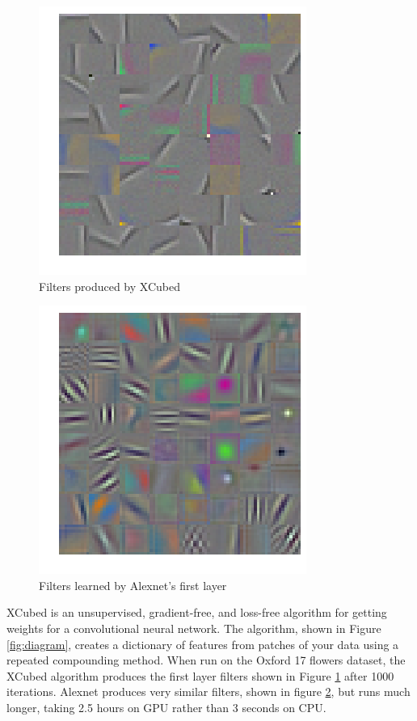\documentclass{article}
\begin{document}
\begin{figure}
    \centering
    \includegraphics[width=.8\linewidth]{x3filters}
    \caption{Filters produced by XCubed}
    \label{fig:x3weights}
\end{figure}
\begin{figure}
    \centering
    \includegraphics[width=.8\linewidth]{trainedfet}
    \caption{Filters learned by Alexnet's first layer}
    \label{fig:learnedweights}
\end{figure}
XCubed is an unsupervised, gradient-free, and loss-free algorithm for getting weights for a convolutional neural network. The algorithm, shown in Figure \ref{fig:diagram}, creates a dictionary of features from patches of your data using a repeated compounding method. When run on the Oxford 17 flowers dataset, the XCubed algorithm produces the first layer filters shown in Figure \ref{fig:x3weights} after 1000 iterations. Alexnet produces very similar filters, shown in figure \ref{fig:learnedweights}, but runs much longer, taking 2.5 hours on GPU rather than 3 seconds on CPU.
\end{document}
